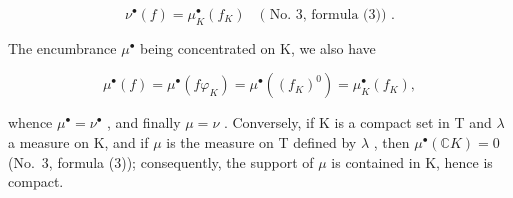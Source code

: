 \[
\nu^ {\bullet} (f) = \mu_ {K} ^ {\bullet} (f _ {K}) \quad (\text { No.   3,   formula   (3)) }.
\]

The encumbrance \(\mu^{\bullet}\) being concentrated on K, we also have

\[
\mu^ {\bullet} (f) = \mu^ {\bullet} (f \varphi_ {K}) = \mu^ {\bullet} ((f _ {K}) ^ {0}) = \mu_ {K} ^ {\bullet} (f _ {K}),
\]

whence \(\mu^{\bullet} = \nu^{\bullet}\) , and finally \(\mu = \nu\) . Conversely, if K is a compact set in T and \(\lambda\) a measure on K, and if \(\mu\) is the measure on T defined by \(\lambda\) , then \(\mu^{\bullet}(\mathbb{C}K) = 0\) (No.~3, formula (3)); consequently, the support of \(\mu\) is contained in K, hence is compact.

